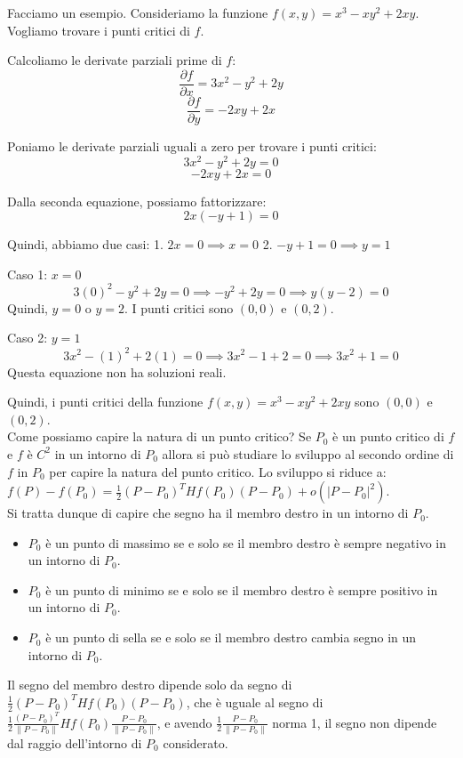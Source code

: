Facciamo un esempio.
Consideriamo la funzione $f(x,y) = x^3 - xy^2 + 2xy$. Vogliamo trovare i punti critici di $f$.

Calcoliamo le derivate parziali prime di $f$:
\[
\frac{\partial f}{\partial x} = 3x^2 - y^2 + 2y
\]
\[
\frac{\partial f}{\partial y} = -2xy + 2x
\]

Poniamo le derivate parziali uguali a zero per trovare i punti critici:
\[
3x^2 - y^2 + 2y = 0
\]
\[
-2xy + 2x = 0
\]

Dalla seconda equazione, possiamo fattorizzare:
\[
2x(-y + 1) = 0
\]

Quindi, abbiamo due casi:
1. $2x = 0 \implies x = 0$
2. $-y + 1 = 0 \implies y = 1$

Caso 1: $x = 0$
\[
3(0)^2 - y^2 + 2y = 0 \implies -y^2 + 2y = 0 \implies y(y - 2) = 0
\]
Quindi, $y = 0$ o $y = 2$. I punti critici sono $(0,0)$ e $(0,2)$.

Caso 2: $y = 1$
\[
3x^2 - (1)^2 + 2(1) = 0 \implies 3x^2 - 1 + 2 = 0 \implies 3x^2 + 1 = 0
\]
Questa equazione non ha soluzioni reali.

Quindi, i punti critici della funzione $f(x,y) = x^3 - xy^2 + 2xy$ sono $(0,0)$ e $(0,2)$.\\

Come possiamo capire la natura di un punto critico?
Se $P_0$ è un punto critico di $f$ e $f$ è $C^2$ in un intorno di $P_0$ allora si può studiare lo sviluppo al secondo ordine di $f$ in $P_0$ per capire la natura del punto critico. Lo sviluppo si riduce a: $f(P) - f(P_0) = \frac{1}{2} (P - P_0)^T Hf(P_0) (P - P_0) + o(|P - P_0|^2)$.\\
Si tratta dunque di capire che segno ha il membro destro in un intorno di $P_0$.
\begin{itemize}
\item $P_0$ è un punto di massimo se e solo se il membro destro è sempre negativo in un intorno di $P_0$.
\item $P_0$ è un punto di minimo se e solo se il membro destro è sempre positivo in un intorno di $P_0$.
\item $P_0$ è un punto di sella se e solo se il membro destro cambia segno in un intorno di $P_0$.
\end{itemize}
\begin{osservazione}{}
  Il segno del membro destro dipende solo da segno di $\frac{1}{2} (P - P_0)^T Hf(P_0) (P - P_0)$, che è uguale al segno di $\frac{1}{2} \frac{(P - P_0)^T}{\|P - P_0\|} Hf(P_0) \frac{P-P_0}{\|P - P_0\|}$, e avendo $\frac{1}{2} \frac{P - P_0}{\|P - P_0\|}$ norma 1, il segno non dipende dal raggio dell'intorno di $P_0$ considerato.
\end{osservazione}

